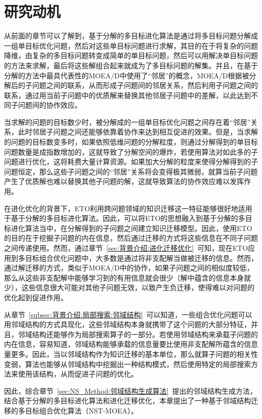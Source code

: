 \section{研究动机}
\label{sec:NST:研究动机}
从前面的章节可以了解到，基于分解的多目标进化算法是通过将多目标问题分解成一组单目标优化问题，然后对这些单目标问题进行求解，其目的在于将复杂的问题降维，由复杂的多目标问题转变成简单的单目标问题，然后可以用解决单目标问题的方法来求解，最后将这些解组合起来就成为了多目标问题的解集。并且，在基于分解的方法中最具代表性的MOEA/D中使用了“邻居”的概念，MOEA/D根据被分解后的子问题之间的联系，从而形成子问题间的邻居关系，然后利用子问题之间的联系，通过用当前子问题中的优质解来替换其他邻居子问题中的差解，以此达到不同子问题间的协作效应。
\par
当求解的问题的目标数少时，被分解成的一组单目标优化问题之间存在着“邻居”关系，此时邻居子问题之间还能够依靠着协作来达到相互促进的效果。但是，当求解的问题的目标数变多时，如果依照低维问题的分解粒度，则通过分解得到的单目标问题数量是成指数增加的，这就导致了分解空间的爆炸，若使用算法对如此多的子问题进行优化，这将耗费大量计算资源。如果加大分解的粒度来使得分解得到的子问题恒定，那么这些子问题之间的“邻居”关系将会变得极其微弱，就算当前子问题产生了优质解也难以替换其他子问题的解，这就导致算法的协作效应难以发挥作用。
\par
在进化优化的背景下，ETO利用跨问题领域的知识迁移这一特征能够很好地适用于基于分解的多目标进化算法。因此，可以将ETO的思想融入到基于分解的多目标进化算法当中，在分解得到的子问题之间建立知识迁移模型。因此，使用ETO的目的在于挖掘子问题的内在信息，然后通过迁移的方式将这些信息在不同子问题之间传递使用。然而，通过章节~\ref{sec:背景介绍:进化迁移优化}~可知，现在ETO应用到多目标组合优化问题中，大多数是通过将非支配解当做被迁移的信息。然而，通过解迁移的方式，类似于MOEA/D中的协作，如果子问题之间的相似度较低，那么从这些非支配解中能够学习到的有用信息就会很少（解中蕴含的信息本身就少），这些信息很大可能对其他子问题无效，以致产生负迁移，使得难以对问题的优化起到促进作用。
\par
从章节~\ref{subsec:背景介绍:局部搜索:邻域结构}~可以知道，一些组合优化问题可以用邻域结构的方式具现化，这些邻域结构本身就携带了这个问题的大部分特征，并且，邻域结构还能够作为局部搜索算子的一部分。若使用邻域结构来承载子问题的内在信息，容易知道，邻域结构能够承载的信息量要比使用非支配解所蕴含的信息量更多。因此，当以邻域结构作为知识迁移的基本单位，那么就算子问题的相关性变弱，算法也能够从邻域结构中挖掘出一种结构模式，然后使用特定的局部搜索方法来使用该结构，从而促进子问题的优化。
\par
因此，综合章节~\ref{sec:NS_Method:邻域结构生成算法}~提出的邻域结构生成方法，结合基于分解的多目标进化算法和进化迁移优化，本章提出了一种基于邻域结构迁移的多目标组合优化算法（NST-MOEA）。

